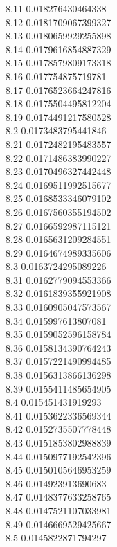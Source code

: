 {8.11	0.018276430464338\\
8.12	0.0181709067399327\\
8.13	0.0180659929255898\\
8.14	0.0179616854887329\\
8.15	0.0178579809173318\\
8.16	0.017754875719781\\
8.17	0.0176523664247816\\
8.18	0.0175504495812204\\
8.19	0.0174491217580528\\
8.2	0.0173483795441846\\
8.21	0.0172482195483557\\
8.22	0.0171486383990227\\
8.23	0.0170496327442448\\
8.24	0.0169511992515677\\
8.25	0.0168533346079102\\
8.26	0.0167560355194502\\
8.27	0.0166592987115121\\
8.28	0.0165631209284551\\
8.29	0.0164674989335606\\
8.3	0.0163724295089226\\
8.31	0.0162779094553366\\
8.32	0.0161839355921908\\
8.33	0.0160905047573567\\
8.34	0.015997613807081\\
8.35	0.0159052596158784\\
8.36	0.0158134390764243\\
8.37	0.0157221490994485\\
8.38	0.0156313866136298\\
8.39	0.0155411485654905\\
8.4	0.015451431919293\\
8.41	0.0153622336569344\\
8.42	0.0152735507778448\\
8.43	0.0151853802988839\\
8.44	0.0150977192542396\\
8.45	0.0150105646953259\\
8.46	0.014923913690683\\
8.47	0.0148377633258765\\
8.48	0.0147521107033981\\
8.49	0.0146669529425667\\
8.5	0.0145822871794297\\
}

